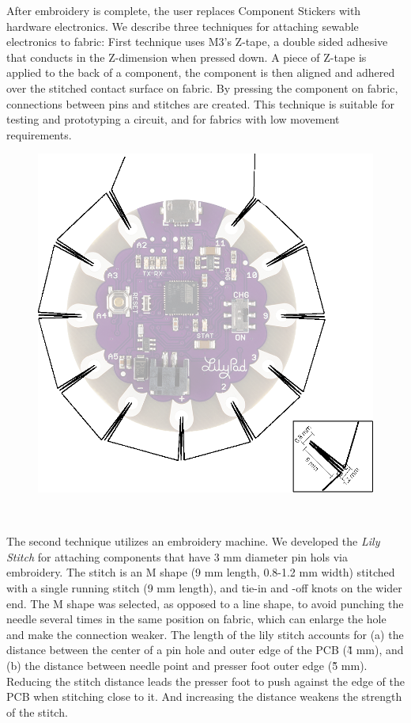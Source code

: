\documentclass[header.tex]{subfiles}
\begin{document}
After embroidery is complete, the user replaces Component Stickers with hardware electronics. 
We describe three techniques for attaching sewable electronics to fabric: First technique uses M3's Z-tape, a double sided adhesive that conducts in the Z-dimension when pressed down. A piece of Z-tape is applied to the back of a component, the component is then aligned and adhered over the stitched contact surface on fabric. By pressing the component on fabric, connections between pins and stitches are created. This technique is suitable for testing and prototyping a circuit, and for fabrics with low movement requirements. 


\begin{figure}
\centering
  \includegraphics[width=0.7\columnwidth]{figures/LilyStitch}
  \caption{}~\label{fig:LilyStitch}
  \vspace{-2.5em}
\end{figure}

The second technique utilizes an embroidery machine. We developed the \textit{Lily Stitch} for attaching components that have 3 mm diameter pin hols via embroidery. The stitch is an M shape (9 mm length, 0.8-1.2 mm width) stitched with a single running stitch (9 mm length), and tie-in and -off knots on the wider end. The M shape was selected, as opposed to a line shape, to avoid punching the needle several times in the same position on fabric, which can enlarge the hole and make the connection weaker. 
The length of the lily stitch accounts for (a) the distance between the center of a pin hole and outer edge of the PCB (\~ 4 mm), and (b) the distance between needle point and presser foot outer edge (\~ 5 mm). Reducing the stitch distance leads the presser foot to push against the edge of the PCB when stitching close to it. And increasing the distance weakens the strength of the stitch.
\end{document}
